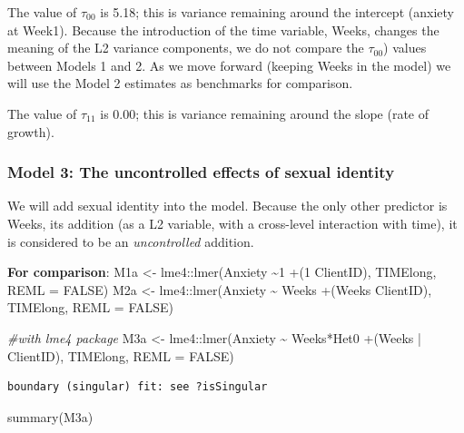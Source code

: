 \documentclass[
  english,
]{book}
\newenvironment{Shaded}{\begin{snugshade}}{\end{snugshade}}
\newcommand{\AttributeTok}[1]{\textcolor[rgb]{0.77,0.63,0.00}{#1}}
\newcommand{\CommentTok}[1]{\textcolor[rgb]{0.56,0.35,0.01}{\textit{#1}}}
\newcommand{\ConstantTok}[1]{\textcolor[rgb]{0.00,0.00,0.00}{#1}}
\newcommand{\FunctionTok}[1]{\textcolor[rgb]{0.00,0.00,0.00}{#1}}
\newcommand{\NormalTok}[1]{#1}
\newcommand{\OtherTok}[1]{\textcolor[rgb]{0.56,0.35,0.01}{#1}}
\newcommand{\SpecialCharTok}[1]{\textcolor[rgb]{0.00,0.00,0.00}{#1}}
\begin{document}
The value of \(\tau _{00}\) is 5.18; this is variance remaining around the intercept (anxiety at Week1). Because the introduction of the time variable, Weeks, changes the meaning of the L2 variance components, we do not compare the \(\tau _{00}\)) values between Models 1 and 2. As we move forward (keeping Weeks in the model) we will use the Model 2 estimates as benchmarks for comparison.

The value of \(\tau _{11}\) is 0.00; this is variance remaining around the slope (rate of growth).

\hypertarget{model-3-the-uncontrolled-effects-of-sexual-identity-1}{%
\subsubsection{Model 3: The uncontrolled effects of sexual identity}\label{model-3-the-uncontrolled-effects-of-sexual-identity-1}}

We will add sexual identity into the model. Because the only other predictor is Weeks, its addition (as a L2 variable, with a cross-level interaction with time), it is considered to be an \emph{uncontrolled} addition.

\textbf{For comparison}:
M1a \textless- lme4::lmer(Anxiety \textasciitilde1 +(1 \textbar{} ClientID), TIMElong, REML = FALSE)
M2a \textless- lme4::lmer(Anxiety \textasciitilde{} Weeks +(Weeks \textbar{} ClientID), TIMElong, REML = FALSE)

\begin{Shaded}
\begin{Highlighting}[]
\CommentTok{\#with lme4 package}
\NormalTok{M3a }\OtherTok{\textless{}{-}}\NormalTok{ lme4}\SpecialCharTok{::}\FunctionTok{lmer}\NormalTok{(Anxiety }\SpecialCharTok{\textasciitilde{}}\NormalTok{ Weeks}\SpecialCharTok{*}\NormalTok{Het0 }\SpecialCharTok{+}\NormalTok{(Weeks }\SpecialCharTok{|}\NormalTok{ ClientID), TIMElong, }\AttributeTok{REML =} \ConstantTok{FALSE}\NormalTok{)}
\end{Highlighting}
\end{Shaded}

\begin{verbatim}
boundary (singular) fit: see ?isSingular
\end{verbatim}

\begin{Shaded}
\begin{Highlighting}[]
\FunctionTok{summary}\NormalTok{(M3a)}
\end{Highlighting}
\end{Shaded}
\end{document}
